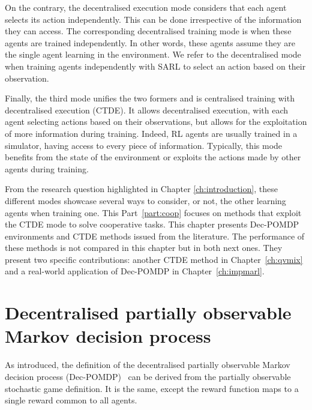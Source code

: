 On the contrary, the decentralised execution mode considers that each agent selects its action independently.
This can be done irrespective of the information they can access.
The corresponding decentralised training mode is when these agents are trained independently.
In other words, these agents assume they are the single agent learning in the environment.
We refer to the decentralised mode when training agents independently with SARL to select an action based on their observation.

Finally, the third mode unifies the two formers and is centralised training with decentralised execution (CTDE).
It allows decentralised execution, with each agent selecting actions based on their observations, but allows for the exploitation of more information during training.
Indeed, RL agents are usually trained in a simulator, having access to every piece of information.
Typically, this mode benefits from the state of the environment or exploits the actions made by other agents during training.

From the research question highlighted in Chapter \ref{ch:introduction}, these different modes showcase several ways to consider, or not, the other learning agents when training one.
This Part~\ref{part:coop} focuses on methods that exploit the CTDE mode to solve cooperative tasks.
This chapter presents Dec-POMDP environments and CTDE methods issued from the literature.
The performance of these methods is not compared in this chapter but in both next ones.
They present two specific contributions: another CTDE method in Chapter~\ref{ch:qvmix} and a real-world application of Dec-POMDP in Chapter~\ref{ch:impmarl}.

\section{Decentralised partially observable Markov decision process}
\label{sec:ch3_decpomdp}
As introduced, the definition of the decentralised partially observable Markov decision process (Dec-POMDP)~\citep{DecPomdp} can be derived from the partially observable stochastic game definition.
It is the same, except the reward function maps to a single reward common to all agents.

